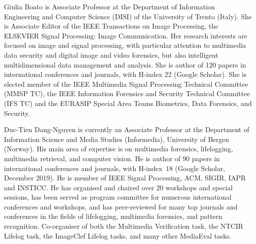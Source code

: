 \documentclass{ieeeaccess}
\begin{document}
\begin{IEEEbiography}{Giulia Boato} is Associate Professor at the Department of Information Engineering and Computer Science (DISI) of the University of Trento (Italy). She is Associate Editor of the IEEE Transactions on Image Processing, the ELSEVIER Signal Processing: Image Communication. Her research interests are focused on image and signal processing, with particular attention to multimedia data security and digital image and video forensics, but also intelligent multidimensional data management and analysis. She is author of 120 papers in international conferences and journals, with H-index 22 (Google Scholar). She is elected member of the IEEE Multimedia Signal Processing Technical Committee (MMSP TC), the IEEE Information Forensics and Security Technical Committee (IFS TC) and the EURASIP Special Area Teams Biometrics, Data Forensics, and Security.
\end{IEEEbiography}

\begin{IEEEbiography}{Duc-Tien Dang-Nguyen} is currently an Associate Professor at the Department of Information Science and Media Studies (Informedia), University of Bergen (Norway). His main area of expertise is on multimedia forensics, lifelogging, multimedia retrieval, and computer vision. 
%
He is author of 90 papers in international conferences and journals, with H-index~18 (Google Scholar, December 2019). He is member of IEEE Signal Processing, ACM, SIGIR, IAPR and INSTICC.  
He has organised and chaired over 20 workshops and special sessions, has been served as program committee for numerous international conferences and workshops, and has peer-reviewed for many top journals and conferences in the fields of lifelogging, multimedia forensics, and pattern recognition. Co-organiser of both the Multimedia Verification task, the NTCIR Lifelog task, the ImageClef Lifelog tasks, and many other MediaEval tasks. 
\end{IEEEbiography}
\end{document}
